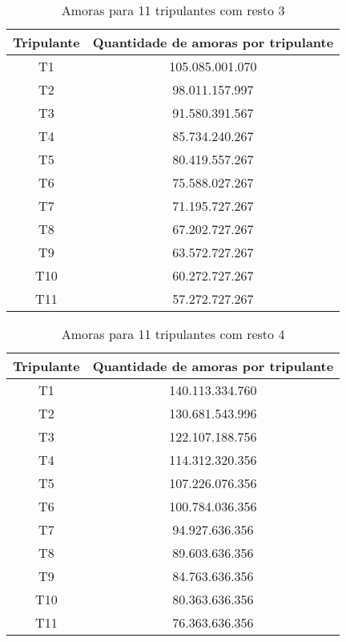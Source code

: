\documentclass[12pt]{article}
\begin{document}
\begin{table}[H]

\centering

\begin{tabular}{|c|c|}

\hline
Tripulante & Quantidade de amoras por tripulante \\
\hline
T1 & 105.085.001.070 \\
\hline
T2 & 98.011.157.997 \\
\hline
T3 & 91.580.391.567 \\
\hline
T4 & 85.734.240.267 \\
\hline
T5 & 80.419.557.267 \\
\hline
T6 & 75.588.027.267 \\
\hline
T7 & 71.195.727.267 \\
\hline
T8 & 67.202.727.267 \\
\hline
T9 & 63.572.727.267 \\
\hline
T10 & 60.272.727.267 \\
\hline
T11 & 57.272.727.267 \\
\hline

\end{tabular}
\label{Tabela25}
\caption{Amoras para 11 tripulantes com resto 3}

\end{table}

\begin{table}[H]

\centering

\begin{tabular}{|c|c|}

\hline
Tripulante & Quantidade de amoras por tripulante \\
\hline
T1 & 140.113.334.760 \\
\hline
T2 & 130.681.543.996 \\
\hline
T3 & 122.107.188.756 \\
\hline
T4 & 114.312.320.356 \\
\hline
T5 & 107.226.076.356 \\
\hline
T6 & 100.784.036.356 \\
\hline
T7 & 94.927.636.356 \\
\hline
T8 & 89.603.636.356 \\
\hline
T9 & 84.763.636.356 \\
\hline
T10 & 80.363.636.356 \\
\hline
T11 & 76.363.636.356 \\
\hline

\end{tabular}
\label{Tabela26}
\caption{Amoras para 11 tripulantes com resto 4}

\end{table}
\end{document}
